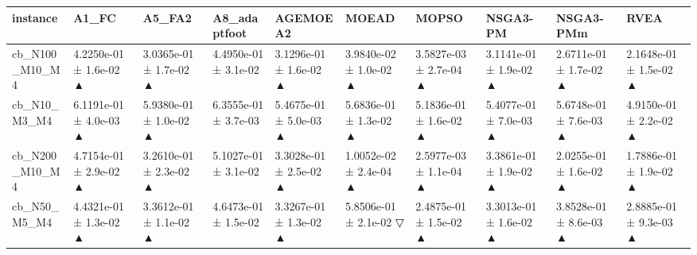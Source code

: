 \begin{tabular}{llllllllll}
\toprule
instance & A1\_FC & A5\_FA2 & A8\_adaptfoot & AGEMOEA2 & MOEAD & MOPSO & NSGA3-PM & NSGA3-PMm & RVEA \\
\midrule
cb\_N100\_M10\_M4 & 4.2250e-01 ± 1.6e-02 ▲ & 3.0365e-01 ± 1.7e-02 ▲ & 4.4950e-01 ± 3.1e-02 & 3.1296e-01 ± 1.6e-02 ▲ & 3.9840e-02 ± 1.0e-02 ▲ & 3.5827e-03 ± 2.7e-04 ▲ & 3.1141e-01 ± 1.9e-02 ▲ & 2.6711e-01 ± 1.7e-02 ▲ & 2.1648e-01 ± 1.5e-02 ▲ \\
cb\_N10\_M3\_M4 & 6.1191e-01 ± 4.0e-03 ▲ & 5.9380e-01 ± 1.0e-02 ▲ & 6.3555e-01 ± 3.7e-03 & 5.4675e-01 ± 5.0e-03 ▲ & 5.6836e-01 ± 1.3e-02 ▲ & 5.1836e-01 ± 1.6e-02 ▲ & 5.4077e-01 ± 7.0e-03 ▲ & 5.6748e-01 ± 7.6e-03 ▲ & 4.9150e-01 ± 2.2e-02 ▲ \\
cb\_N200\_M10\_M4 & 4.7154e-01 ± 2.9e-02 ▲ & 3.2610e-01 ± 2.3e-02 ▲ & 5.1027e-01 ± 3.1e-02 & 3.3028e-01 ± 2.5e-02 ▲ & 1.0052e-02 ± 2.4e-04 ▲ & 2.5977e-03 ± 1.1e-04 ▲ & 3.3861e-01 ± 1.9e-02 ▲ & 2.0255e-01 ± 1.6e-02 ▲ & 1.7886e-01 ± 1.9e-02 ▲ \\
cb\_N50\_M5\_M4 & 4.4321e-01 ± 1.3e-02 ▲ & 3.3612e-01 ± 1.1e-02 ▲ & 4.6473e-01 ± 1.5e-02 & 3.3267e-01 ± 1.3e-02 ▲ & 5.8506e-01 ± 2.1e-02 ▽ & 2.4875e-01 ± 1.5e-02 ▲ & 3.3013e-01 ± 1.6e-02 ▲ & 3.8528e-01 ± 8.6e-03 ▲ & 2.8885e-01 ± 9.3e-03 ▲ \\
\bottomrule
\end{tabular}
